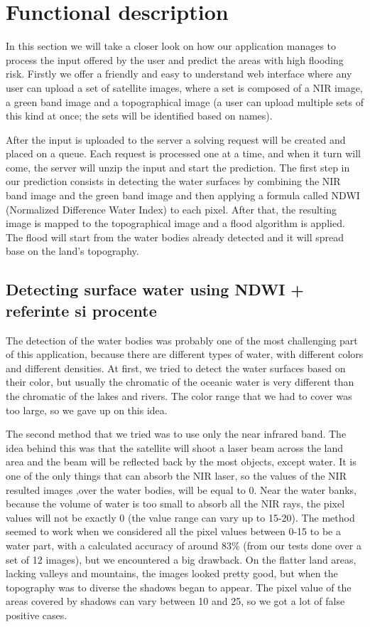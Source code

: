 \documentclass[12pt, a4paper]{report}
\begin{document}
\section{Functional description}

\quad
In this section we will take a closer look on how our application manages to process the input offered by the user and predict the areas with high flooding risk. Firstly we offer a friendly and easy to understand web interface where any user can upload a set of satellite images, where a set is composed of a NIR image, a green band image and a topographical image (a user can upload multiple sets of this kind at once; the sets will be identified based on names).
\par 
 After the input is uploaded to the server a solving request will be created and placed on a queue. Each request is processed one at a time, and when it turn will come, the server will unzip the input and start the prediction. The first step in our prediction consists in detecting the water surfaces by combining the NIR band image and the green band image and then applying a formula called NDWI (Normalized Difference Water Index) to each pixel. After that, the resulting image is mapped to the topographical image and a flood algorithm is applied. The flood will start from the water bodies already detected and it will spread base on the land's topography.


\subsection{Detecting surface water using NDWI + referinte si procente}
\quad 

The detection of the water bodies was probably one of the most challenging part of this application, because there are different types of water, with different colors and different densities. At first, we tried to detect the water surfaces based on their color, but usually the chromatic of the oceanic water is very different than the chromatic of the lakes and rivers. The color range that we had to cover was too large, so we gave up on this idea. 
\par 
The second method that we tried was to use only the near infrared band. The idea behind this was that the satellite will shoot a laser beam across the land area and the beam will be reflected back by the most objects, except water. It is one of the only things that can absorb the NIR laser, so the values of the NIR resulted images ,over the water bodies, will be equal to 0. Near the water banks, because the volume of water is too small to absorb all the NIR rays, the pixel values will not be exactly 0 (the value range can vary up to 15-20). The method seemed to work when we considered all the pixel values between 0-15 to be a water part, with a calculated accuracy of around 83\% (from our tests done over a set of 12 images), but we encountered a big drawback. On the flatter land areas, lacking valleys and mountains, the images looked pretty good, but when the topography was to diverse the shadows began to appear. The pixel value of the areas covered by shadows can vary between 10 and 25, so we got a lot of false positive cases.
\end{document}
